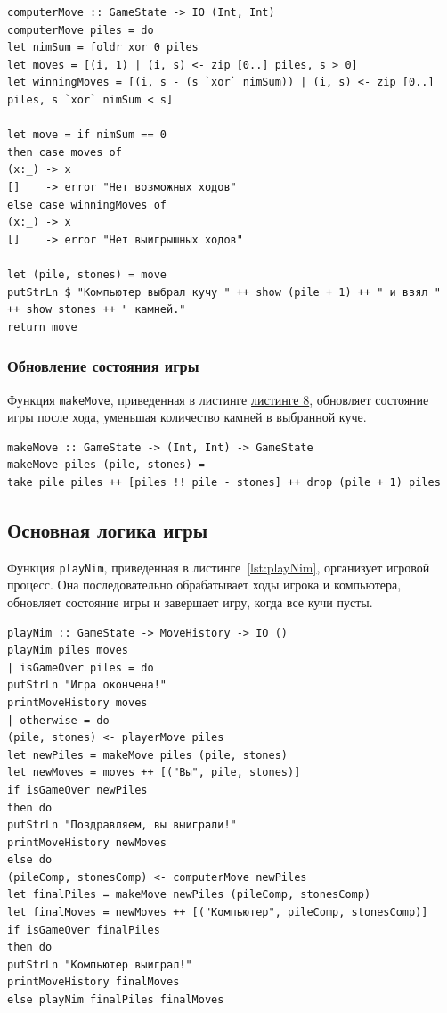 \documentclass[11pt,a4paper,final]{article} %
\begin{document}
\begin{lstlisting}[caption={Ход компьютера}, label={lst:computerMove}]
computerMove :: GameState -> IO (Int, Int)
computerMove piles = do
let nimSum = foldr xor 0 piles
let moves = [(i, 1) | (i, s) <- zip [0..] piles, s > 0]
let winningMoves = [(i, s - (s `xor` nimSum)) | (i, s) <- zip [0..] piles, s `xor` nimSum < s]

let move = if nimSum == 0 
then case moves of 
(x:_) -> x 
[]    -> error "Нет возможных ходов" 
else case winningMoves of 
(x:_) -> x
[]    -> error "Нет выигрышных ходов" 

let (pile, stones) = move
putStrLn $ "Компьютер выбрал кучу " ++ show (pile + 1) ++ " и взял " ++ show stones ++ " камней."
return move
\end{lstlisting}

\subsubsection{Обновление состояния игры}

Функция \texttt{makeMove}, приведенная в листинге \hyperref[lst:makeMove]{листинге 8}, обновляет состояние игры после хода, уменьшая количество камней в выбранной куче.

\begin{lstlisting}[caption={Обновление состояния игры}, label={lst:makeMove}]
makeMove :: GameState -> (Int, Int) -> GameState
makeMove piles (pile, stones) = 
take pile piles ++ [piles !! pile - stones] ++ drop (pile + 1) piles
\end{lstlisting}

\subsection{Основная логика игры}

Функция \texttt{playNim}, приведенная в листинге~\ref{lst:playNim}, организует игровой процесс. Она последовательно обрабатывает ходы игрока и компьютера, обновляет состояние игры и завершает игру, когда все кучи пусты.

\begin{lstlisting}[caption={Основная логика игры}, label={lst:playNim}]
playNim :: GameState -> MoveHistory -> IO ()
playNim piles moves
| isGameOver piles = do
putStrLn "Игра окончена!"
printMoveHistory moves
| otherwise = do
(pile, stones) <- playerMove piles
let newPiles = makeMove piles (pile, stones)
let newMoves = moves ++ [("Вы", pile, stones)]
if isGameOver newPiles
then do
putStrLn "Поздравляем, вы выиграли!"
printMoveHistory newMoves
else do
(pileComp, stonesComp) <- computerMove newPiles
let finalPiles = makeMove newPiles (pileComp, stonesComp)
let finalMoves = newMoves ++ [("Компьютер", pileComp, stonesComp)]
if isGameOver finalPiles
then do
putStrLn "Компьютер выиграл!"
printMoveHistory finalMoves
else playNim finalPiles finalMoves
\end{lstlisting}
\end{document}
